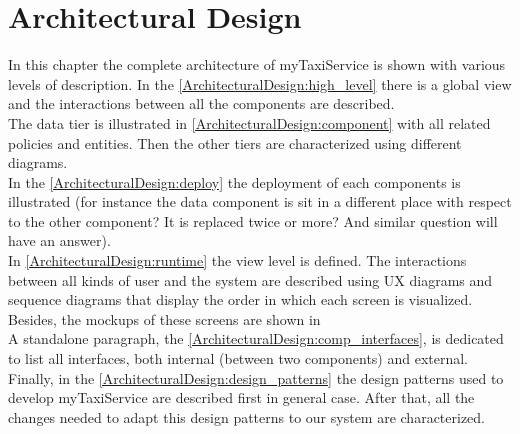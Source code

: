\documentclass[\mainpath/main]{subfiles}
\begin{document}
\chapter{Architectural Design}
\label{architectural_design}

\setmyfancystyle

In this chapter the complete architecture of myTaxiService is shown with various levels of description. In the \autoref{ArchitecturalDesign:high_level} there is a global view and the interactions between all the components are described.\\ 
The data tier is illustrated in \autoref{ArchitecturalDesign:component} with all related policies and entities. Then the other tiers are characterized using different diagrams.\\
In the \autoref{ArchitecturalDesign:deploy} the deployment of each components is illustrated (for instance the data component is sit in a different place with respect to the other component? It is replaced twice or more? And similar question will have an answer).\\
In \autoref{ArchitecturalDesign:runtime} the view level is defined. The interactions between all kinds of user and the system are described using UX diagrams and sequence diagrams that display the order in which each screen is visualized. Besides, the \glspl{mockup} of these screens are shown in %
\\
A standalone paragraph, the \autoref{ArchitecturalDesign:comp_interfaces}, is dedicated to list all interfaces, both internal (between two components) and external.\\
Finally, in the \autoref{ArchitecturalDesign:design_patterns} the design patterns used to develop myTaxiService are described first in general case. After that, all the changes needed to adapt this design patterns to our system are characterized.
\end{document}
